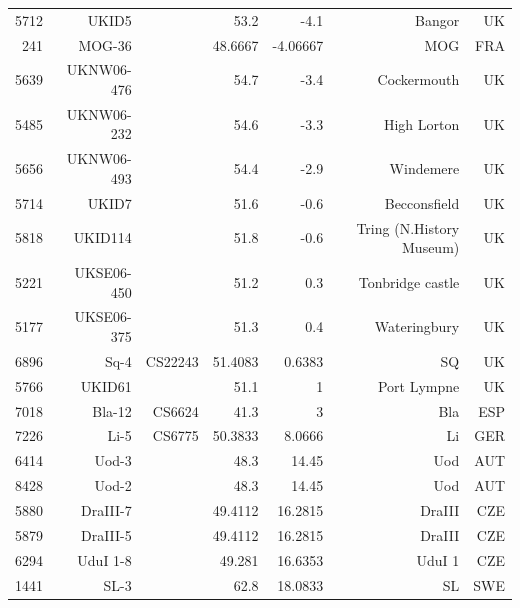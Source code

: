 \documentclass[a4paper,10pt]{article}
\begin{document}
\begin{table}
\begin{tabular}{|r|r|r|r|r|r|r|}
5712 & UKID5       &             &     53.2 &      -4.1 & Bangor                   & UK  \\
 241 & MOG-36      &             &  48.6667 &  -4.06667 & MOG                      & FRA \\
5639 & UKNW06-476  &             &     54.7 &      -3.4 & Cockermouth              & UK  \\
5485 & UKNW06-232  &             &     54.6 &      -3.3 & High Lorton              & UK  \\
5656 & UKNW06-493  &             &     54.4 &      -2.9 & Windemere                & UK  \\
5714 & UKID7       &             &     51.6 &      -0.6 & Becconsfield             & UK  \\
5818 & UKID114     &             &     51.8 &      -0.6 & Tring (N.History Museum) & UK  \\
5221 & UKSE06-450  &             &     51.2 &       0.3 & Tonbridge castle         & UK  \\
5177 & UKSE06-375  &             &     51.3 &       0.4 & Wateringbury             & UK  \\
6896 & Sq-4        & CS22243     &  51.4083 &    0.6383 & SQ                       & UK  \\
5766 & UKID61      &             &     51.1 &         1 & Port Lympne              & UK  \\
7018 & Bla-12      & CS6624      &     41.3 &         3 & Bla                      & ESP \\
7226 & Li-5        & CS6775      &  50.3833 &    8.0666 & Li                       & GER \\
6414 & Uod-3       &             &     48.3 &     14.45 & Uod                      & AUT \\
8428 & Uod-2       &             &     48.3 &     14.45 & Uod                      & AUT \\
5880 & DraIII-7    &             &  49.4112 &   16.2815 & DraIII                   & CZE \\
5879 & DraIII-5    &             &  49.4112 &   16.2815 & DraIII                   & CZE \\
6294 & UduI 1-8    &             &   49.281 &   16.6353 & UduI 1                   & CZE \\
1441 & SL-3        &             &     62.8 &   18.0833 & SL                       & SWE \\
\hline
\end{tabular}
\label{thap_2}
\end{table}
\end{document}
